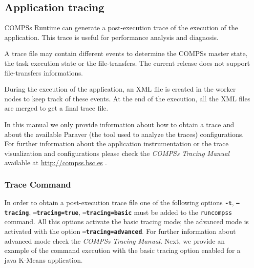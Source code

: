 \subsection{Application tracing}
\label{sec:Tracing}

COMPSs Runtime can generate a post-execution trace of the execution of the application. This trace is useful for
performance analysis and diagnosis.

A trace file may contain different events to determine the COMPSs master state, the task execution state or the file-transfers.
The current release does not support file-transfers informations.

During the execution of the application, an XML file is created in the worker nodes to keep track of 
these events. At the end of the execution, all the XML files are merged to get a final trace file.

In this manual we only provide information about how to obtain a trace and about the available Paraver (the tool used to analyze the traces) configurations. For further
information about the application instrumentation or the trace visualization and configurations please check the \textit{COMPSs Tracing Manual} 
available at \url{http://compss.bsc.es} .

\subsubsection{Trace Command}


In order to obtain a post-execution trace file one of the following options \texttt{\textbf{-t}}, \texttt{\textbf{--tracing}}, \texttt{\textbf{--tracing=true}}, \texttt{\textbf{--tracing=basic}} 
must be added to the \texttt{runcompss} command. All this options activate the basic tracing mode; the advanced mode is activated with the 
option \texttt{\textbf{--tracing=advanced}}. For further information about advanced mode check the \textit{COMPSs Tracing Manual}. Next, we
provide an example of the command execution with the basic tracing option enabled for a java K-Means application.

